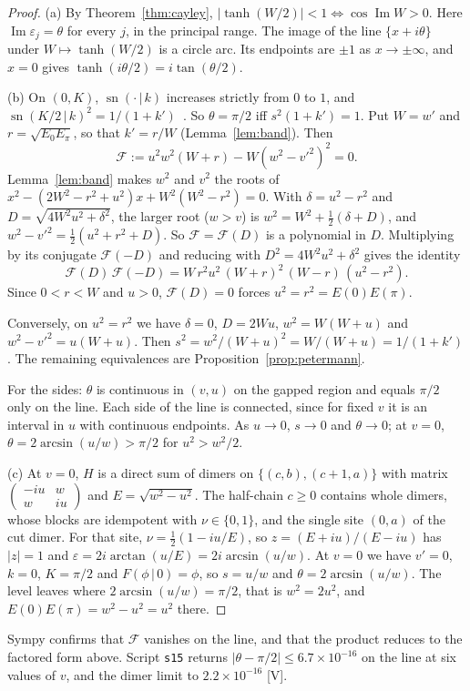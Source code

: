 \documentclass[11pt]{article}
\theoremstyle{definition}
\newcommand{\grade}[1]{\textsf{\small[#1]}}
\newcommand{\Ima}{\operatorname{Im}}
\newcommand{\sn}{\operatorname{sn}}
\begin{document}
\begin{proof}
(a) By Theorem~\ref{thm:cayley}, $|\tanh(W/2)|<1\iff\cos\Ima W>0$. Here $\Ima\varepsilon_j=\theta$ for every $j$, in the principal range. The image of the line $\{x+i\theta\}$ under $W\mapsto\tanh(W/2)$ is a circle arc. Its endpoints are $\pm1$ as $x\to\pm\infty$, and $x=0$ gives $\tanh(i\theta/2)=i\tan(\theta/2)$.

(b) On $(0,K)$, $\sn(\cdot\,|\,k)$ increases strictly from $0$ to $1$, and $\sn(K/2\,|\,k)^2=1/(1+k')$~\cite{byrd}. So $\theta=\pi/2$ iff $s^2(1+k')=1$. Put $W=w'$ and $r=\sqrt{E_0E_\pi}$, so that $k'=r/W$ (Lemma~\ref{lem:band}). Then
\[
\mathcal F:=u^2w^2(W+r)-W(w^2-v'^2)^2=0.
\]
Lemma~\ref{lem:band} makes $w^2$ and $v^2$ the roots of $x^2-(2W^2-r^2+u^2)x+W^2(W^2-r^2)=0$. With $\delta=u^2-r^2$ and $D=\sqrt{4W^2u^2+\delta^2}$, the larger root ($w>v$) is $w^2=W^2+\tfrac12(\delta+D)$, and $w^2-v'^2=\tfrac12(u^2+r^2+D)$. So $\mathcal F=\mathcal F(D)$ is a polynomial in $D$. Multiplying by its conjugate $\mathcal F(-D)$ and reducing with $D^2=4W^2u^2+\delta^2$ gives the identity
\[
\mathcal F(D)\,\mathcal F(-D)=W\,r^2u^2\,(W+r)^2\,(W-r)\,(u^2-r^2).
\]
Since $0<r<W$ and $u>0$, $\mathcal F(D)=0$ forces $u^2=r^2=E(0)E(\pi)$.

Conversely, on $u^2=r^2$ we have $\delta=0$, $D=2Wu$, $w^2=W(W+u)$ and $w^2-v'^2=u(W+u)$. Then $s^2=w^2/(W+u)^2=W/(W+u)=1/(1+k')$. The remaining equivalences are Proposition~\ref{prop:petermann}.

For the sides: $\theta$ is continuous in $(v,u)$ on the gapped region and equals $\pi/2$ only on the line. Each side of the line is connected, since for fixed $v$ it is an interval in $u$ with continuous endpoints. As $u\to0$, $s\to0$ and $\theta\to0$; at $v=0$, $\theta=2\arcsin(u/w)>\pi/2$ for $u^2>w^2/2$.

(c) At $v=0$, $H$ is a direct sum of dimers on $\{(c,b),(c+1,a)\}$ with matrix $\begin{pmatrix}-iu&w\\w&iu\end{pmatrix}$ and $E=\sqrt{w^2-u^2}$. The half-chain $c\ge0$ contains whole dimers, whose blocks are idempotent with $\nu\in\{0,1\}$, and the single site $(0,a)$ of the cut dimer. For that site, $\nu=\tfrac12(1-iu/E)$, so $z=(E+iu)/(E-iu)$ has $|z|=1$ and $\varepsilon=2i\arctan(u/E)=2i\arcsin(u/w)$. At $v=0$ we have $v'=0$, $k=0$, $K=\pi/2$ and $F(\phi\,|\,0)=\phi$, so $s=u/w$ and $\theta=2\arcsin(u/w)$. The level leaves where $2\arcsin(u/w)=\pi/2$, that is $w^2=2u^2$, and $E(0)E(\pi)=w^2-u^2=u^2$ there.
\end{proof}
Sympy confirms that $\mathcal F$ vanishes on the line, and that the product reduces to the factored form above. Script \texttt{s15} returns $|\theta-\pi/2|\le6.7\times10^{-16}$ on the line at six values of $v$, and the dimer limit to $2.2\times10^{-16}$ \grade{V}.
\end{document}
